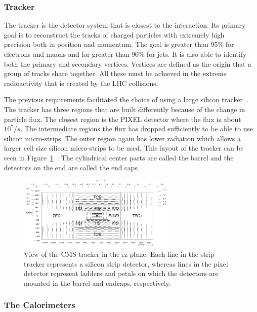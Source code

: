 \subsubsection{Tracker}
The tracker is the detector system that is closest to the interaction.  Its primary goal is to reconstruct the tracks of charged particles with extremely high precision both in position and momentum. The goal is greater than 95\% for electrons and muons and for greater than 90\% for jets. It is also able to identify both the primary and secondary vertices.  Vertices are defined as the origin that a group of tracks share together. All these must be achieved in the extreme radioactivity that is created by the LHC collisions.~\cite{cms_trakcer_project}

The previous requirements facilitated the choice of using a large silicon tracker~\cite{cms_trakcer_project}.  The tracker has three regions that are built differently because of the change in particle flux.  The closest region is the PIXEL detector where the flux is about $10^7/s$.  The intermediate regions the flux has dropped sufficiently to be able to use silicon micro-strips.  The outer region again has lower radiation which allows a larger cell size silicon micro-strips to be used.  This layout of the tracker can be seen in Figure~\ref{fig:CMS_tacker}~\cite{2010JInst...5.6007S}.  The cylindrical center parts are called the barrel and the detectors on the end are called the end caps. 

\begin{figure}[htb]
\centering
\includegraphics[width=0.69\textwidth]{Experiment/fig_cmstracker.png}
\caption{View of the CMS tracker in the rz-plane. Each line in the strip tracker represents a silicon strip detector, whereas lines in the pixel detector represent ladders and petals on which the detectors are mounted in the barrel and endcaps, respectively.~\cite{2010JInst...5.6007S}}
\label{fig:CMS_tacker}
\end{figure}

\subsubsection{The Calorimeters}

